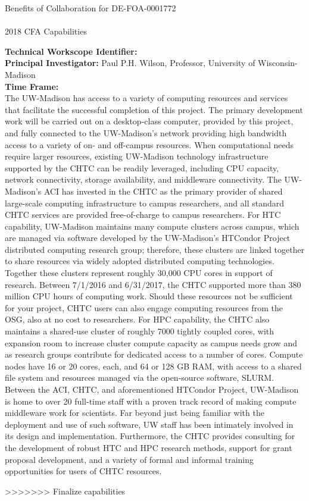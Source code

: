 \documentclass[dvips,12pt]{article}
\begin{document}
\begin{centering}
  Benefits of Collaboration for DE-FOA-0001772\\
  \textbf{\large \mytitle}\\
  2018 CFA Capabilities \ID\\
\end{centering}
\vspace{1em}

\noindent\textbf{Technical Workscope Identifier:} \workscope\\
\textbf{Principal Investigator:} Paul P.H. Wilson, Professor, University of Wisconsin-Madison\\
\textbf{Time Frame:} \timeframe\\

The UW-Madison has access to a variety of computing resources and services
that facilitate the successful completion of this project.  The primary
development work will be carried out on a desktop-class computer, provided by
this project, and fully connected to the UW-Madison's network providing high
bandwidth access to a variety of on- and off-campus resources.  When
computational needs require larger resources, existing UW-Madison technology
infrastructure supported by the \gls{CHTC} can be readily leveraged, including
CPU capacity, network connectivity, storage availability, and middleware
connectivity. The UW-Madison's \gls{ACI} has invested in the \gls{CHTC} as the
primary provider of shared large-scale computing infrastructure to campus
researchers, and all standard \gls{CHTC} services are provided free-of-charge
to campus researchers. For \gls{HTC} capability,
UW-Madison maintains many compute clusters across campus, which are managed
via software developed by the UW-Madison's HTCondor Project distributed
computing research group; therefore, these clusters are linked together to
share resources via widely adopted distributed computing
technologies. Together these clusters represent roughly 30,000 CPU cores in
support of research. Between 7/1/2016 and 6/31/2017, the \gls{CHTC} supported
more than 380 million CPU hours of computing work. Should these resources not
be sufficient for your project, \gls{CHTC} users can also engage computing
resources from the \gls{OSG}, also at no cost to
researchers. For \gls{HPC} capability, the \gls{CHTC}
also maintains a shared-use cluster of roughly 7000 tightly coupled cores,
with expansion room to increase cluster compute capacity as campus needs grow
and as research groups contribute for dedicated access to a number of
cores. Compute nodes have 16 or 20 cores, each, and 64 or 128 GB RAM, with
access to a shared file system and resources managed via the open-source
software, SLURM.  Between the ACI, \gls{CHTC}, and aforementioned HTCondor
Project, UW-Madison is home to over 20 full-time staff with a proven track
record of making compute middleware work for scientists. Far beyond just being
familiar with the deployment and use of such software, UW staff has been
intimately involved in its design and implementation. Furthermore, the
\gls{CHTC} provides consulting for the development of robust HTC and HPC
research methods, support for grant proposal development, and a variety of
formal and informal training opportunities for users of \gls{CHTC} resources.


>>>>>>> Finalize capabilities


\label{LastPage}
\end{document}
